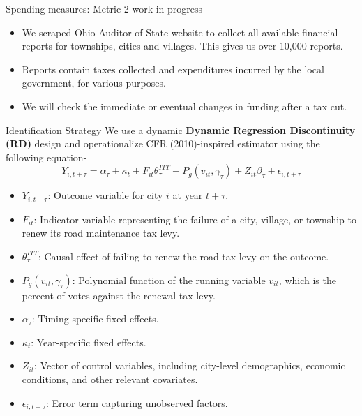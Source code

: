 \documentclass{beamer}
\begin{document}
\begin{frame}{Spending measures: Metric 2 work-in-progress}
    \begin{itemize}
        \item We scraped Ohio Auditor of State website to collect all available financial reports for townships, cities and villages. This gives us over 10,000 reports.
        \item Reports contain taxes collected and expenditures incurred by the local government, for various purposes. 
        \item  We will check the immediate or eventual changes in funding after a tax cut.
    \end{itemize}
\end{frame}

\begin{frame}{Identification Strategy}
    We use a dynamic \textbf{Dynamic Regression Discontinuity (RD)} design and operationalize CFR (2010)-inspired estimator using the following equation-
        \begin{equation}
            Y_{i,t+\tau} = \alpha_\tau + \kappa_t + F_{it} \theta_{\tau}^{ITT} + P_g (v_{it}, \gamma_\tau) + Z_{it} \beta_\tau + \epsilon_{i,t + \tau}
            \label{eq:itt_estimator}
        \end{equation}
        \begin{itemize}
            \item[] \scriptsize $Y_{i,t+\tau}$: Outcome variable for city $i$ at year $t + \tau$.
            \item[] \scriptsize $F_{it}$: Indicator variable representing the failure of a city, village, or township to renew its road maintenance tax levy.
            \item[] \scriptsize $\theta_{\tau}^{ITT}$: Causal effect of failing to renew the road tax levy on the outcome.
            \item[] \scriptsize $P_g (v_{it}, \gamma_\tau)$: Polynomial function of the running variable $v_{it}$, which is the percent of votes against the renewal tax levy.
            \item[] \scriptsize $\alpha_\tau$: Timing-specific fixed effects.
            \item[] \scriptsize $\kappa_t$: Year-specific fixed effects.
            \item[] \scriptsize $Z_{it}$: Vector of control variables, including city-level demographics, economic conditions, and other relevant covariates.
            \item[] \scriptsize $\epsilon_{i,t + \tau}$: Error term capturing unobserved factors.
        \end{itemize}
\end{frame}
\end{document}
